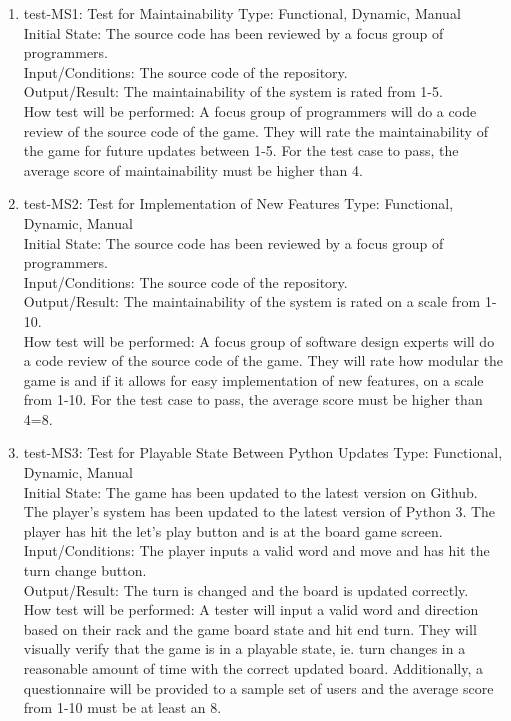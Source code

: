 \documentclass[12pt, titlepage]{article}
\begin{document}
\begin{enumerate}
    \item{test-MS1: Test for Maintainability} %
    Type: Functional, Dynamic, Manual\\
    Initial State: The source code has been reviewed by a focus group of programmers.\\
    Input/Conditions: The source code of the repository.\\
    Output/Result:  The maintainability of the system is rated from 1-5.\\
    How test will be performed: A focus group of programmers will do a code review of the source code of the game. They will rate the maintainability of the game for future updates between 1-5. For the test case to pass, the average score of maintainability must be higher than 4.\\
    
    \item{test-MS2: Test for Implementation of New Features} %
    Type: Functional, Dynamic, Manual\\
    Initial State: The source code has been reviewed by a focus group of programmers.\\
    Input/Conditions: The source code of the repository.\\
    Output/Result:  The maintainability of the system is rated on a scale from 1-10.\\
    How test will be performed: A focus group of software design experts will do a code review of the source code of the game. They will rate how modular the game is and if it allows for easy implementation of new features, on a scale from 1-10. For the test case to pass, the average score must be higher than 4=8.\\
    
    \item{test-MS3: Test for Playable State Between Python Updates} %
    Type: Functional, Dynamic, Manual\\
    Initial State: The game has been updated to the latest version on Github. The player's system has been updated to the latest version of Python 3. The player has hit the let's play button and is at the board game screen.\\
    Input/Conditions: The player inputs a valid word and move and has hit the turn change button.\\
    Output/Result:  The turn is changed and the board is updated correctly.\\
    How test will be performed: A tester will input a valid word and direction based on their rack and the game board state and hit end turn. They will visually verify that the game is in a playable state, ie. turn changes in a reasonable amount of time with the correct updated board. Additionally, a questionnaire will be provided to a sample set of users and the average score from 1-10 must be at least an 8.\\
\end{enumerate}
\end{document}
